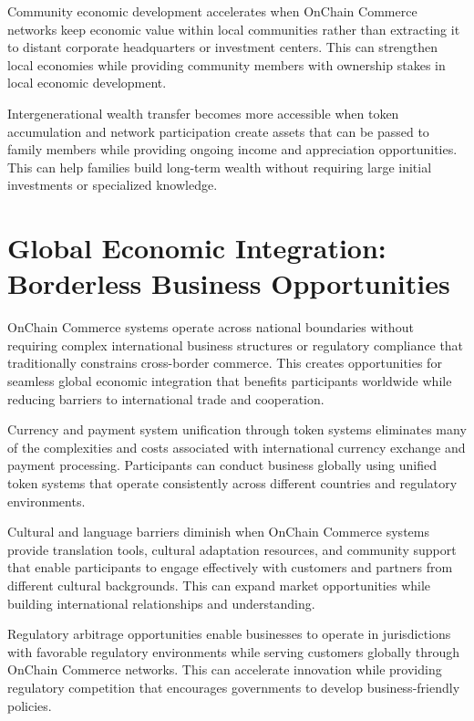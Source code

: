 \documentclass[
  Letterpaper,
]{scrbook}
\begin{document}
Community economic development accelerates when OnChain Commerce
networks keep economic value within local communities rather than
extracting it to distant corporate headquarters or investment centers.
This can strengthen local economies while providing community members
with ownership stakes in local economic development.

Intergenerational wealth transfer becomes more accessible when token
accumulation and network participation create assets that can be passed
to family members while providing ongoing income and appreciation
opportunities. This can help families build long-term wealth without
requiring large initial investments or specialized knowledge.

\section{Global Economic Integration: Borderless Business
Opportunities}\label{global-economic-integration-borderless-business-opportunities}

OnChain Commerce systems operate across national boundaries without
requiring complex international business structures or regulatory
compliance that traditionally constrains cross-border commerce. This
creates opportunities for seamless global economic integration that
benefits participants worldwide while reducing barriers to international
trade and cooperation.

Currency and payment system unification through token systems eliminates
many of the complexities and costs associated with international
currency exchange and payment processing. Participants can conduct
business globally using unified token systems that operate consistently
across different countries and regulatory environments.

Cultural and language barriers diminish when OnChain Commerce systems
provide translation tools, cultural adaptation resources, and community
support that enable participants to engage effectively with customers
and partners from different cultural backgrounds. This can expand market
opportunities while building international relationships and
understanding.

Regulatory arbitrage opportunities enable businesses to operate in
jurisdictions with favorable regulatory environments while serving
customers globally through OnChain Commerce networks. This can
accelerate innovation while providing regulatory competition that
encourages governments to develop business-friendly policies.
\end{document}
